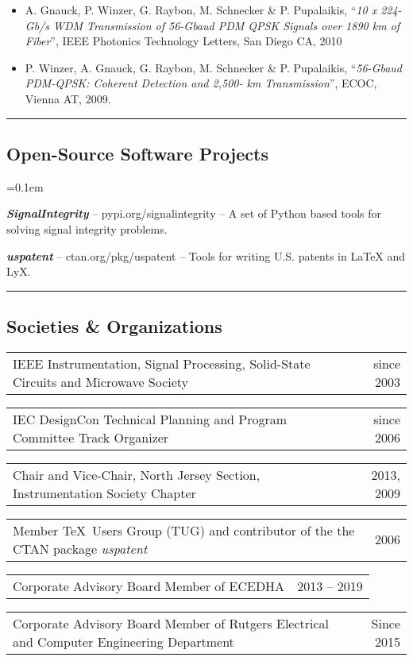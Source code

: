 \documentclass[10pt,letterpaper]{extarticle}
\makeatletter
\newenvironment{indentsection}[1]%
{\begin{list}{}%
	{\setlength{\leftmargin}{#1}}%
	\item[]%
}
{\end{list}}
\newcommand{\headerrow}[2]
{\begin{tabular*}{\linewidth}{l@{\extracolsep{\fill}}r}
	#1 &
	#2 \\
\end{tabular*}}
\makeatother
\begin{document}
\begin{indentsection}{-1em}
\begin{itemize}
\item A. Gnauck, P. Winzer, G. Raybon, M. Schnecker \& P. Pupalaikis, “\emph{10 x 224-Gb/s WDM Transmission of 56-Gbaud PDM QPSK Signals over 1890 km of Fiber}”, IEEE Photonics Technology Letters, San Diego CA, 2010 
\item P. Winzer, A. Gnauck, G. Raybon, M. Schnecker \& P. Pupalaikis, “\emph{56-Gbaud PDM-QPSK: Coherent Detection and 2,500- km Transmission}”, ECOC, Vienna AT, 2009. 
\end{itemize}\end{indentsection}
\hrule
\vspace{-1em}\subsection*{\Large Open-Source Software Projects}\vspace{-0.5em}
	\parskip=0.1em
\begin{flushleft} 
\vspace{0.2em}\begin{indentsection}{-1em}\begin{itemize*}
		\item \textbf{\emph{SignalIntegrity}} -- \textsf{pypi.org/signalintegrity} -- A set of Python based tools for solving signal integrity problems.
		\item \textbf{\emph{uspatent}} -- \textsf{ctan.org/pkg/uspatent} -- Tools for writing U.S. patents in LaTeX and LyX.
\end{itemize*}\end{indentsection}\end{flushleft}
\vspace{0.2em}
\hrule
\vspace{-1em}\subsection*{\Large Societies \& Organizations}\vspace{-0.5em}
\headerrow
		{IEEE Instrumentation, Signal Processing, Solid-State Circuits and Microwave Society}
		{since 2003}
\headerrow
		{IEC DesignCon Technical Planning and Program Committee Track Organizer}
		{since 2006}
\headerrow
		{Chair and Vice-Chair, North Jersey Section, Instrumentation Society Chapter}
		{2013, 2009}
\headerrow
		{Member \TeX~Users Group (TUG) and contributor of the the CTAN package \emph{uspatent}}
		{2006}
\headerrow
		{Corporate Advisory Board Member of ECEDHA}
		{2013 -- 2019}
\headerrow
		{Corporate Advisory Board Member of Rutgers Electrical and Computer Engineering Department}
		{Since 2015}
\end{document}
